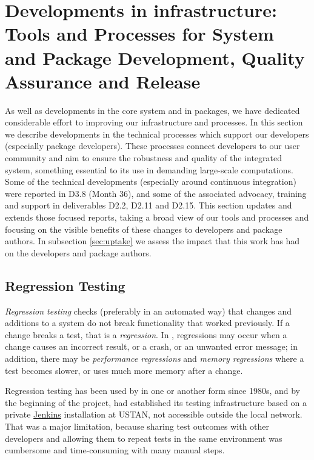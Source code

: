 \section{Developments in \GAP infrastructure: Tools and Processes for
  System and Package Development, Quality Assurance and Release }\label{sec:gap-infra}

As well as developments in the core system and in packages, we have
dedicated considerable effort to improving our infrastructure and
processes.  In this section we describe developments in the technical
processes which support our developers (especially package
developers). These processes connect developers to our user community and aim to ensure the
robustness and quality of the integrated system, something essential
to its use in demanding large-scale computations. Some of the
technical developments (especially around continuous integration) were
reported in D3.8 (Month 36), and some of the associated advocacy,
training and support in deliverables D2.2, D2.11 and D2.15. This
section updates and extends those focused reports, taking a broad
view of our tools and processes and focusing on the visible benefits
of these changes to developers and package authors. In subsection
\ref{sec:uptake} we assess the impact that this work has
had on the developers and package authors.

\subsection{Regression Testing}\label{testing}

\emph{Regression testing} %
checks (preferably in an automated way)
that changes and additions to a system do not break functionality that 
worked previously. If a change breaks a test, that is 
a \emph{regression}. In \GAP, regressions may occur
when a change causes an incorrect result, or a crash, or an unwanted error
message; in addition, there may be \emph{performance regressions}
and \emph{memory regressions} where a test becomes slower, or uses
much more memory after a change.

Regression testing has been used by \GAP in one or another form since 
1980s, and by the beginning of the \ODK project, \GAP had established its testing infrastructure
based on a private \href{https://jenkins.io/}{\sf Jenkins} installation
at USTAN, not accessible outside the local network. That was a major limitation,
because sharing test outcomes with other developers and
allowing them to repeat tests in the same environment was cumbersome
and time-consuming with many manual steps.

